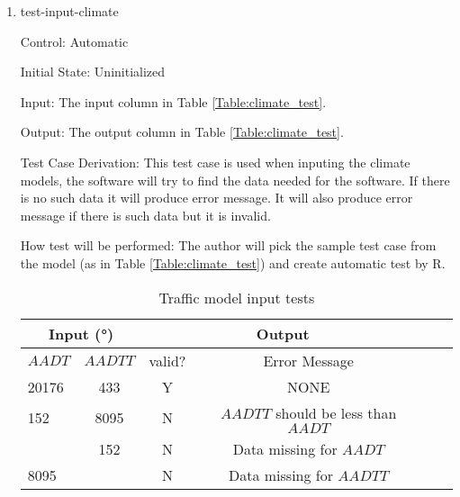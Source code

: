 \documentclass[12pt, titlepage]{article}
\begin{document}
\begin{enumerate}

\item{test-input-climate\\}

Control: Automatic
					
Initial State: Uninitialized
					
Input: The input column in Table \ref{Table:climate_test}.
					
Output: The output column in Table \ref{Table:climate_test}. 

Test Case Derivation: This test case is used when inputing the climate models, the software will try to find the data needed for the software. If there is no such data it will produce error message. It will also produce error message if there is such data but it is invalid. 
					
How test will be performed: The author will pick the sample test case from the model (as in Table \ref{Table:climate_test}) and create automatic test by R.



\begin{center}
\begin{table}[h]
\resizebox{\textwidth}{!}
{ %
    \begin{tabular}{ lccccc }
    \hline
      \multicolumn{2}{c|}{Input (\si[per-mode=symbol] {\degree}) }                            & \multicolumn{2}{c}{Output} \\ 
    
    \hline

        $AADT$   &   $AADTT$   &   valid?   &   Error Message \\ \hline
    
       20176  & 433 &   Y  & NONE                        \\      \hline
       152  & 8095 &   N  & $AADTT$ should be less than $AADT$                        \\      \hline
         & 152 &   N  & Data missing for $AADT$                        \\      \hline
       8095 & &   N  & Data missing for $AADTT$                        \\      \hline
    
    \end{tabular} %
}
\caption{Traffic model input tests}
\label{Table:traffic_test}
\end{table}
\end{center}


\end{enumerate}
\end{document}
